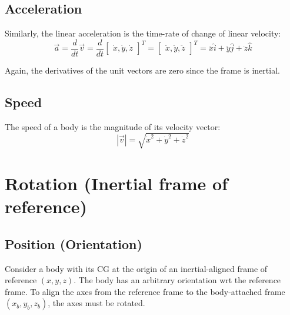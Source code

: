 \subsection{Acceleration}
Similarly, the linear acceleration is the time-rate of change of linear velocity:
\begin{equation} \nonumber
    \vec{a} = \frac{d}{dt} \vec{v}
    = \frac{d}{dt} \begin{bmatrix}
        \dot{x}, \dot{y}, \dot{z}
    \end{bmatrix}^T = \begin{bmatrix}
        \ddot{x}, \ddot{y}, \ddot{z}
    \end{bmatrix}^T =
    \ddot{x} \hat{i} + \ddot{y} \hat{j} + \ddot{z} \hat{k}
\end{equation}

Again, the derivatives of the unit vectors are zero since the frame is inertial.

\subsection{Speed}
The speed of a body is the magnitude of its velocity vector:
\begin{equation} \nonumber
    |\vec{v}| = \sqrt{\dot{x}^2 + \dot{y}^2 + \dot{z}^2}
\end{equation}


\section{Rotation (Inertial frame of reference)}
\subsection{Position (Orientation)}
Consider a body with its CG at the origin of an inertial-aligned frame of reference \((x, y, z)\). The body has an arbitrary orientation wrt the reference frame.
To align the axes from the reference frame to the body-attached frame \((x_b, y_b, z_b)\), the axes must be rotated.

